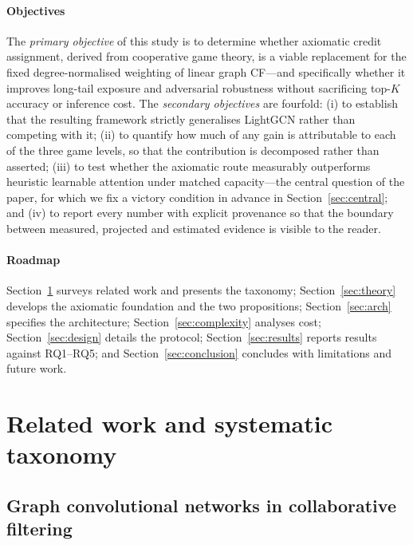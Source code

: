 \documentclass[final,5p,times,twocolumn]{elsarticle}
\begin{document}
\paragraph{Objectives}
The \emph{primary objective} of this study is to determine whether axiomatic
credit assignment, derived from cooperative game theory, is a viable
replacement for the fixed degree-normalised weighting of linear graph CF---and
specifically whether it improves long-tail exposure and adversarial robustness
without sacrificing top-$K$ accuracy or inference cost. The \emph{secondary
objectives} are fourfold: (i) to establish that the resulting framework
strictly generalises LightGCN rather than competing with it; (ii) to quantify
how much of any gain is attributable to each of the three game levels, so that
the contribution is decomposed rather than asserted; (iii) to test whether the
axiomatic route measurably outperforms heuristic learnable attention under
matched capacity---the central question of the paper, for which we fix a
victory condition in advance in Section~\ref{sec:central}; and (iv) to report
every number with explicit provenance so that the boundary between measured,
projected and estimated evidence is visible to the reader.

\paragraph{Roadmap}
Section~\ref{sec:related} surveys related work and presents the taxonomy;
Section~\ref{sec:theory} develops the axiomatic foundation and the two
propositions; Section~\ref{sec:arch} specifies the architecture;
Section~\ref{sec:complexity} analyses cost; Section~\ref{sec:design} details
the protocol; Section~\ref{sec:results} reports results against RQ1--RQ5; and
Section~\ref{sec:conclusion} concludes with limitations and future work.

\section{Related work and systematic taxonomy}
\label{sec:related}

\subsection{Graph convolutional networks in collaborative filtering}
\label{sec:rw-gcn}
\end{document}
